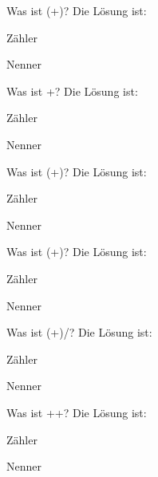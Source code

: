 \documentclass{ximera}
\begin{document}
\begin{shuffle}

\begin{question}
Was ist (+)\cdot{}?
Die Lösung ist:
\begin{solution}
Zähler 
\end{solution}
\begin{solution}
Nenner 
\end{solution}
\end{question}


\begin{question}
Was ist +\cdot{}?
Die Lösung ist:
\begin{solution}
Zähler 
\end{solution}
\begin{solution}
Nenner 
\end{solution}
\end{question}


\begin{question}
Was ist (+)\cdot{}?
Die Lösung ist:
\begin{solution}
Zähler 
\end{solution}
\begin{solution}
Nenner 
\end{solution}
\end{question}


\begin{question}
Was ist \cdot(+)?
Die Lösung ist:
\begin{solution}
Zähler 
\end{solution}
\begin{solution}
Nenner 
\end{solution}
\end{question}


\begin{question}
Was ist (+)/?
Die Lösung ist:
\begin{solution}
Zähler 
\end{solution}
\begin{solution}
Nenner 
\end{solution}
\end{question}


\begin{question}
Was ist ++?
Die Lösung ist:
\begin{solution}
Zähler 
\end{solution}
\begin{solution}
Nenner 
\end{solution}
\end{question}



\end{shuffle}
\end{document}

